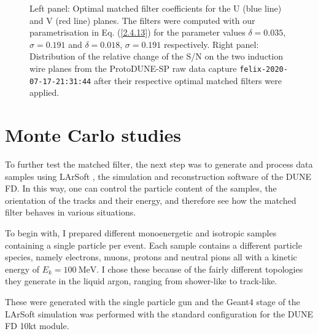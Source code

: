 \begin{figure}[t]
\begin{subfigure}{0.5\textwidth}
	\end{subfigure}
	\caption[Distribution of the relative change of the S/N on the induction planes from the ProtoDUNE-SP raw data capture after their respective optimal matched filters were applied.]{Left panel: Optimal matched filter coefficients for the U (blue line) and V (red line) planes. The filters were computed with our parametrisation in Eq. (\ref{2.4.13}) for the parameter values $\delta = 0.035$, $\sigma = 0.191$ and $\delta = 0.018$, $\sigma = 0.191$ respectively. Right panel: Distribution of the relative change of the S/N on the two induction wire planes from the ProtoDUNE-SP raw data capture \texttt{felix-2020-07-17-21:31:44} after their respective optimal matched filters were applied.}
	\label{fig:mf_perf}
\end{figure}

\section{Monte Carlo studies}
\label{sec:matched_filter_mc_studies}

To further test the matched filter, the next step was to generate and process data samples using LArSoft \cite{Church2013}, the simulation and reconstruction software of the DUNE FD. In this way, one can control the particle content of the samples, the orientation of the tracks and their energy, and therefore see how the matched filter behaves in various situations.

To begin with, I prepared different monoenergetic and isotropic samples containing a single particle per event. Each sample contains a different particle species, namely electrons, muons, protons and neutral pions all with a kinetic energy of $E_{k} = 100 \ \mathrm{MeV}$. I chose these because of the fairly different topologies they generate in the liquid argon, ranging from shower-like to track-like.

These were generated with the single particle gun and the Geant4 stage of the LArSoft simulation \cite{Church2013} was performed with the standard configuration for the DUNE FD 10kt module.

